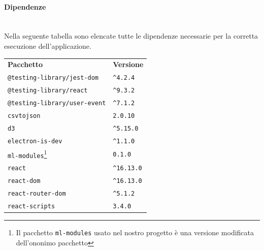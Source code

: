 \paragraph*{Dipendenze}\mbox{}\\ [1mm]
Nella seguente tabella sono elencate tutte le dipendenze necessarie per la corretta esecuzione dell'applicazione.
\mbox{}\\ [1mm]
	\setcounter{table}{0}
	\begin{longtable} {
		>{}p{65mm} 
		>{}p{30mm}
		}
    \rowcolor{gray!50}
    \textbf{Pacchetto} & \textbf{Versione} \TBstrut \\ [2mm]
    \verb|@testing-library/jest-dom| & \verb|^4.2.4|  \TBstrut \\ [2mm]
    \verb|@testing-library/react| & \verb|^9.3.2| \TBstrut \\ [2mm]
    \verb|@testing-library/user-event| & \verb|^7.1.2| \TBstrut \\ [2mm]
    \verb|csvtojson| & \verb|2.0.10| \TBstrut \\ [2mm]
    \verb|d3| & \verb|^5.15.0| \TBstrut \\ [2mm]
    \verb|electron-is-dev| & \verb|^1.1.0| \TBstrut \\ [2mm]
    \verb|ml-modules|\footnote{Il pacchetto \texttt{ml-modules} usato nel nostro progetto è una versione modificata dell'ononimo pacchetto} & \verb|0.1.0| \TBstrut \\ [2mm]
    \verb|react| & \verb|^16.13.0| \TBstrut \\ [2mm]
    \verb|react-dom| & \verb|^16.13.0| \TBstrut \\ [2mm]
    \verb|react-router-dom| & \verb|^5.1.2| \TBstrut \\ [2mm]
    \verb|react-scripts| & \verb|3.4.0| \TBstrut \\ [2mm]
    \end{longtable}
    
